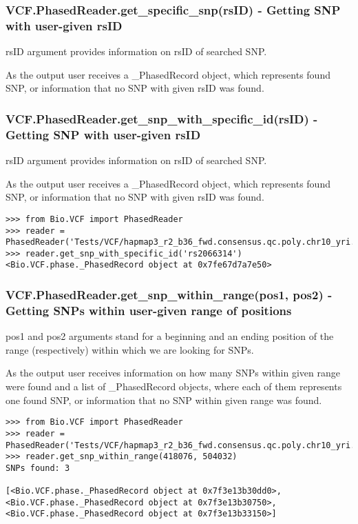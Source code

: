 \subsubsection{VCF.PhasedReader.get\_specific\_snp(rsID) - Getting SNP with user-given rsID}

\noindent rsID argument provides information on rsID of searched SNP.

\noindent As the output user receives a \_PhasedRecord object, which represents found SNP, or information that no SNP with given rsID was found.

\subsubsection{VCF.PhasedReader.get\_snp\_with\_specific\_id(rsID) - Getting SNP with user-given rsID}

\noindent rsID argument provides information on rsID of searched SNP.

\noindent As the output user receives a \_PhasedRecord object, which represents found SNP, or information that no SNP with given rsID was found.

\begin{verbatim}
>>> from Bio.VCF import PhasedReader
>>> reader = PhasedReader('Tests/VCF/hapmap3_r2_b36_fwd.consensus.qc.poly.chr10_yri.D.phased')
>>> reader.get_snp_with_specific_id('rs2066314')
<Bio.VCF.phase._PhasedRecord object at 0x7fe67d7a7e50>

\end{verbatim}

\subsubsection{VCF.PhasedReader.get\_snp\_within\_range(pos1, pos2) - Getting SNPs within user-given range of positions}

\noindent pos1 and pos2 arguments stand for a beginning and an ending position of the range (respectively) within which we are looking for SNPs.

\noindent As the output user receives information on how many SNPs within given range were found and a list of \_PhasedRecord objects, where each of them represents
one found SNP, or information that no SNP within given range was found.

\begin{verbatim}
>>> from Bio.VCF import PhasedReader
>>> reader = PhasedReader('Tests/VCF/hapmap3_r2_b36_fwd.consensus.qc.poly.chr10_yri.D.phased')
>>> reader.get_snp_within_range(418076, 504032)
SNPs found: 3

[<Bio.VCF.phase._PhasedRecord object at 0x7f3e13b30dd0>,
<Bio.VCF.phase._PhasedRecord object at 0x7f3e13b30750>,
<Bio.VCF.phase._PhasedRecord object at 0x7f3e13b33150>]

\end{verbatim}

